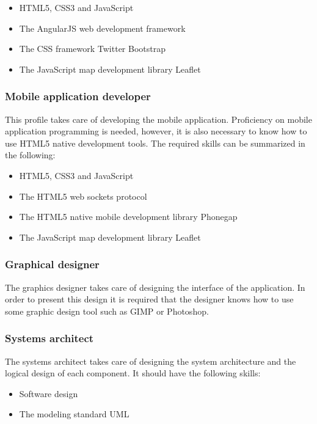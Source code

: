 \begin{itemize}
\item HTML5, CSS3 and JavaScript
\item The AngularJS web development framework
\item The CSS framework Twitter Bootstrap
\item The JavaScript map development library Leaflet
\end{itemize}

\subsubsection*{Mobile application developer}

This profile takes care of developing the mobile application. Proficiency on mobile application programming is needed, however, it is also necessary to know how to use HTML5 native development tools. The required skills can be summarized in the following:

\begin{itemize}
\item HTML5, CSS3 and JavaScript
\item The HTML5 web sockets protocol
\item The HTML5 native mobile development library Phonegap
\item The JavaScript map development library Leaflet
\end{itemize}

\subsubsection{Graphical designer}

The graphics designer takes care of designing the interface of the application. In order to present this design it is required that the designer knows how to use some graphic design tool such as GIMP or Photoshop. 

\subsubsection{Systems architect}

The systems architect takes care of designing the system architecture and the logical design of each component. It should have the following skills:

\begin{itemize}
\item Software design
\item The modeling standard UML
\end{itemize}

